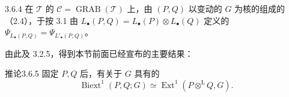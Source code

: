 \begin{SGAresult}{}{3.6.4}
在 $\mathcal T$ 的 $\mathcal C=\operatorname{GRAB}(\mathcal T)$ 上，由 $(P,Q)$ 以变动的 $G$ 为核的组成的（2.4），于按 3.1 由 $L_\bullet(P,Q)=L_\bullet(P)\otimes L_\bullet(Q)$ 定义的 $\Psi_{L_\bullet(P,Q)}=\Psi_{L'_\bullet(P,Q)}$。
\end{SGAresult}
由此及 3.2.5，得到本节前面已经宣布的主要结果：
\begin{SGAresult}{推论}{3.6.5}
固定 $P,Q$ 后，有关于 $G$ 具有的
\[
\operatorname{Biext}^1(P,Q;G)\simeq\operatorname{Ext}^1(P\mathbin{\otimes^{\mathrm L}}Q,G).\tag{3.6.5.1}
\]
\end{SGAresult}
